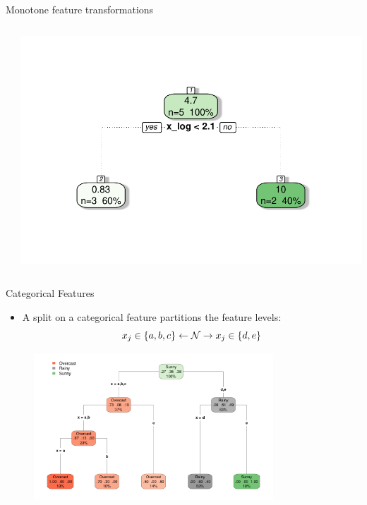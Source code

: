 \documentclass[11pt,compress,t,notes=noshow, xcolor=table]{beamer}
\begin{document}
\begin{vbframe}{Monotone feature transformations}
\begin{columns}[T]
\begin{knitrout}
\end{knitrout}
\includegraphics[width = \textwidth]{figure/cart_splitcomp_2}
\end{columns}
\vspace{0.5cm}
\centering
\end{vbframe}

\begin{vbframe}{Categorical Features}
  \begin{itemize}
  \item A split on a categorical feature partitions the feature levels:
    $$x_j \in \{a,b,c\} \leftarrow \mathcal{N} \rightarrow x_j \in \{d,e\} $$
  \end{itemize}
  \begin{figure}
   \includegraphics[width=0.8\textwidth]{figure/tree-categorical.pdf} 
  \end{figure}
  \end{vbframe}
  
\end{document}
